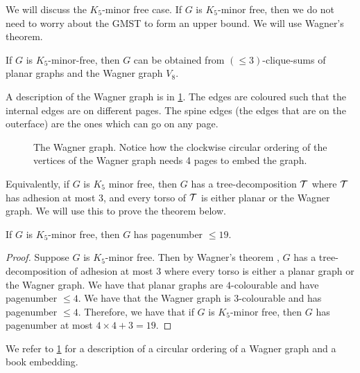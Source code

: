 We will discuss the \(K_5\)-minor free case. If \(G\) is \(K_5\)-minor free, then we do not need to worry about the GMST to form an upper bound. We will use Wagner's theorem.
\begin{theorem}\label{thm:WagnersTheorem}
	If \(G\) is \(K_5\)-minor-free, then \(G\) can be obtained from \((\leq 3)\)-clique-sums of planar graphs and the Wagner graph \(V_8\).
\end{theorem}
A description of the Wagner graph is in \cref{fig:wagner}. The edges are coloured such that the internal edges are on different pages. The spine edges (the edges that are on the outerface) are the ones which can go on any page. 
\begin{figure}[h]
	\centering
	\begin{tikzpicture}
		
	\end{tikzpicture}
	\caption{The Wagner graph. Notice how the clockwise circular ordering of the vertices of the Wagner graph needs 4 pages to embed the graph. }\label{fig:wagner}
\end{figure}

Equivalently, if \(G\) is \(K_5\) minor free, then \(G\) has a tree-decomposition \(\tree\) where \(\tree\) has adhesion at most 3, and every torso of \(\tree\) is either planar or the Wagner graph. We will use this to prove the theorem below. 
\begin{theorem}
	If \(G\) is \(K_5\)-minor free, then \(G\) has pagenumber \(\leq 19\).
\end{theorem}

\begin{proof}
	Suppose \(G\) is \(K_5\)-minor free. Then by Wagner's theorem \cite{wagnerUeberEigenschaftEbenen1937}, \(G\) has a tree-decomposition of adhesion at most 3 where every torso is either a planar graph or the Wagner graph.
	We have that planar graphs are \(4\)-colourable and have pagenumber \(\leq 4\). We have that the Wagner graph is \(3\)-colourable and has pagenumber \(\leq 4\). Therefore, we have that if \(G\) is \(K_5\)-minor free, then \(G\) has pagenumber at most \(4 \times 4 + 3 = 19\). 
\end{proof}
We refer to \cref{fig:wagner} for a description of a circular ordering of a Wagner graph and a book embedding. 
